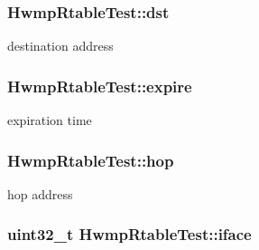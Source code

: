 \subsubsection[{\texorpdfstring{dst}{dst}}]{ Hwmp\+Rtable\+Test\+::dst\hspace{0.3cm}{\ttfamily [private]}}\hypertarget{classHwmpRtableTest_a1acc76986a88c36bbc037c166aa1b93e}{}\label{classHwmpRtableTest_a1acc76986a88c36bbc037c166aa1b93e}


destination address 

\subsubsection[{\texorpdfstring{expire}{expire}}]{ Hwmp\+Rtable\+Test\+::expire\hspace{0.3cm}{\ttfamily [private]}}\hypertarget{classHwmpRtableTest_acfa35462586de4a38db8264663d00438}{}\label{classHwmpRtableTest_acfa35462586de4a38db8264663d00438}


expiration time 

\subsubsection[{\texorpdfstring{hop}{hop}}]{ Hwmp\+Rtable\+Test\+::hop\hspace{0.3cm}{\ttfamily [private]}}\hypertarget{classHwmpRtableTest_ad88abf12d8a5c539bec9046b0b137900}{}\label{classHwmpRtableTest_ad88abf12d8a5c539bec9046b0b137900}


hop address 

\subsubsection[{\texorpdfstring{iface}{iface}}]{\setlength{\rightskip}{0pt plus 5cm}uint32\+\_\+t Hwmp\+Rtable\+Test\+::iface\hspace{0.3cm}{\ttfamily [private]}}\hypertarget{classHwmpRtableTest_a2e1be779ea06d1ae0ac21d4462e5306b}{}\label{classHwmpRtableTest_a2e1be779ea06d1ae0ac21d4462e5306b}


